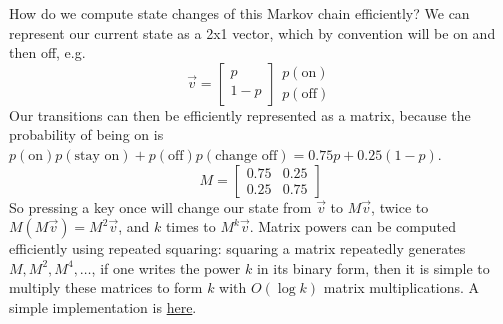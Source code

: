 \documentclass[11pt, oneside]{article}
\begin{document}
How do we compute state changes of this Markov chain
efficiently? We can represent our current state as a 2x1
vector, which by convention will be on and then off, e.g.
\[ \vec{v} = \begin{bmatrix} p \\ 1 - p \end{bmatrix} 
\begin{matrix} p(\text{on}) \\ p(\text{off}) \end{matrix} \] 
Our transitions can then be efficiently represented as a matrix,
because the probability of being on is 
\( p(\text{on})p(\text{stay on}) + p(\text{off})p(\text{change off}) 
= 0.75p + 0.25(1 - p) \).
\[ M = \begin{bmatrix} 0.75 & 0.25 \\ 0.25 & 0.75 \end{bmatrix} \]
So pressing a key once will change our state from \( \vec{v} \) to 
\( M \vec{v} \), twice to \( M(M \vec{v}) = M^2 \vec{v} \), and \( k \)
times to \( M^k \vec{v} \). Matrix powers can be computed efficiently using
repeated squaring: squaring a matrix repeatedly generates 
\( M, M^2, M^4, \dots \), if one writes the power \( k \) in its binary form,
then it is simple to multiply these matrices to form \( k \) with 
\( O(\log k) \) matrix multiplications.
A simple implementation is \href{https://activities.tjhsst.edu/cubing/static/pdfs/cubing-lectures/EigenvaluesofPermutationMatrices/eigenvalue.pdf#page=5}{here}.
\end{document}
